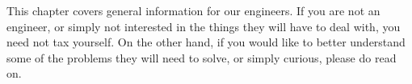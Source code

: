 

This chapter covers general information for our engineers. If you are not an engineer, or simply not interested in the things they will have to deal with, you need not tax yourself. On the other hand, if you would like to better understand some of the problems they will need to solve, or simply curious, please do read on.



%


\StopChapter

